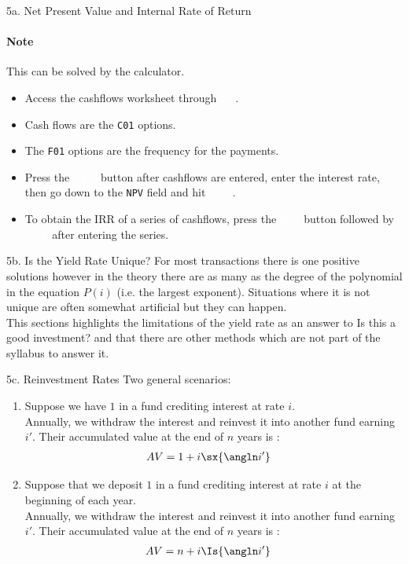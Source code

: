 \begin{CHPT_SUMM_AUTO}[label = {L.-5a}]{5a. Net Present Value and Internal Rate of Return}
\paragraph{Note}	This can be solved by the calculator.
\begin{itemize}[leftmargin = *]
	\item	Access the cashflows worksheet through \colorbox{arsenic}{\textcolor{white}{CF}}.
	\item	Cash flows are the \texttt{C01} options.
	\item	The \texttt{F01} options are the frequency for the payments.
	\item	Press the \colorbox{arsenic}{\textcolor{white}{NPV}} button after cashflows are entered, enter the interest rate, then go down to the \texttt{NPV} field and hit \colorbox{arsenic}{\textcolor{white}{CPT}}.
	\item	To obtain the IRR of a series of cashflows, press the \colorbox{arsenic}{\textcolor{white}{IRR}} button followed by \colorbox{arsenic}{\textcolor{white}{CPT}} after entering the series.
\end{itemize}
\end{CHPT_SUMM_AUTO}

\begin{CHPT_SUMM_AUTO}[label = {L.-5b}]{5b. Is the Yield Rate Unique?}
For most transactions there is one positive solutions however in the theory there are as many as the degree of the polynomial in the equation $P(i)$ (i.e. the largest exponent). Situations where it is not unique are often somewhat artificial but they can happen. \\

This sections highlights the limitations of the yield rate as an answer to \og Is this a good investment? \fg{} and that there are other methods which are not part of the syllabus to answer it.
\end{CHPT_SUMM_AUTO}

\begin{CHPT_SUMM_AUTO}[label = {L.-5c}]{5c. Reinvestment Rates}
Two general scenarios:
\begin{enumerate}[leftmargin = *]
	\item	Suppose we have $1$ in a fund crediting interest at rate $i$.\\
			Annually, we withdraw the interest and reinvest it into another fund earning $i'$.
			Their accumulated value at the end of $n$ years is :
			\begin{align*}
			AV
			&=	1 + i \sx{\angln i'}
			\end{align*}
	\item	Suppose that we deposit $1$ in a fund crediting interest at rate $i$ at the beginning of each year.\\
			Annually, we withdraw the interest and reinvest it into another fund earning $i'$.
			Their accumulated value at the end of $n$ years is :
			\begin{align*}
			AV
			&=	n + i \Is{\angln i'}
			\end{align*}
\end{enumerate}
\end{CHPT_SUMM_AUTO}


